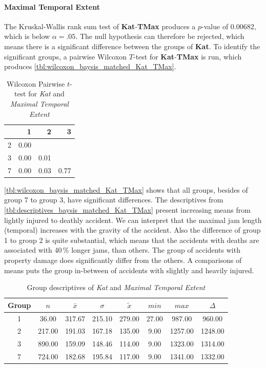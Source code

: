 \paragraph{Maximal Temporal Extent}
The Kruskal-Wallis rank sum test of \textbf{Kat}-\textbf{TMax} produces a $p$-value of 0.00682, which is below $\alpha=.05$. The null hypothesis can therefore be rejected, which means there is a significant difference between the groups of \textbf{Kat}. To identify the significant groups, a pairwise Wilcoxon $T$-test for \textbf{Kat}-\textbf{TMax} is run, which produces \autoref{tbl:wilcoxon_baysis_matched_Kat_TMax}.
\begin{table}[ht]
	\small
	\centering
	\begin{tabular}{rrrr}
	  	\toprule
	 	& 1 & 2 & 3 \\ 
	  	\midrule
		2 & 0.00 &  &  \\ 
	  	3 & 0.00 & 0.01 &  \\ 
	  	7 & 0.00 & 0.03 & 0.77 \\ 
	   	\bottomrule
	\end{tabular}
	\caption{Wilcoxon Pairwise $t$-test for \textit{Kat} and \textit{Maximal Temporal Extent}}
	\label{tbl:wilcoxon_baysis_matched_Kat_TMax}
\end{table}
\autoref{tbl:wilcoxon_baysis_matched_Kat_TMax} shows that all groups, besides of group 7 to group 3, have significant differences. The descriptives from \autoref{tbl:descriptives_baysis_matched_Kat_TMax} present increasing means from lightly injured to deathly accident. We can interpret that the maximal jam length (temporal) increases with the gravity of the accident. Also the difference of group 1 to group 2 is quite substantial, which means that the accidents with deaths are associated with 40\,\% longer jams, than others. The group of accidents with property damage does significantly differ from the others. A comparisons of means puts the group in-between of accidents with slightly and heavily injured.
\begin{table}[ht]
	\small
	\centering
	\begin{tabular}{c|c|c|c|c|c|c|c}
		\toprule
		Group & $n$ & $\bar{x}$ & $\sigma$ & $\tilde{x}$ & $min$ & $max$ & $\Delta$ \\   
	  	\midrule
		1 & 36.00 & 317.67 & 215.10 & 279.00   & 27.00 & 987.00 & 960.00  \\ 
	  	2 & 217.00 & 191.03 & 167.18 & 135.00 & 9.00 & 1257.00 & 1248.00  \\ 
	  	3 & 890.00 & 159.09 & 148.46 & 114.00 & 9.00 & 1323.00 & 1314.00  \\ 
	  	7 & 724.00 & 182.68 & 195.84 & 117.00  & 9.00 & 1341.00 & 1332.00 \\ 
	   	\bottomrule
	\end{tabular}
	\caption{Group descriptives of \textit{Kat} and \textit{Maximal Temporal Extent}}
	\label{tbl:descriptives_baysis_matched_Kat_TMax}
\end{table}

